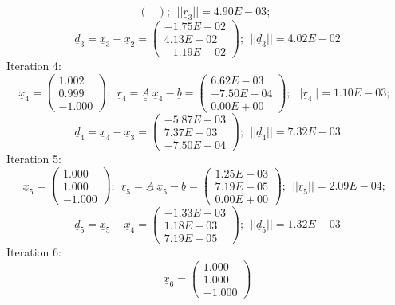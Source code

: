 \documentclass{report}[10pts]
\begin{document}
\begin{small}
\[\begin{pmatrix}
   \end{pmatrix}
;~~
||
\underline{r}_{3}
||=
4.90E-03
;~~
\]
\[
\underline{d}_{3}=
\underline{x}_{3}-
\underline{x}_{2}=
   \begin{pmatrix}
   -1.75E-02 \\ 4.13E-02 \\ -1.19E-02
   \end{pmatrix}
;~~
||
\underline{d}_{3}
||=
4.02E-02
\]
Iteration 4:
\[
\underline{x}_{4}=
   \begin{pmatrix}
   1.002 \\ 0.999 \\ -1.000
   \end{pmatrix}
;~~
\underline{r}_{4}=
\underline{\underline{A}}~\underline{x}_{4}-
\underline{b}=
   \begin{pmatrix}
   6.62E-03 \\ -7.50E-04 \\ 0.00E+00
   \end{pmatrix}
;~~
||
\underline{r}_{4}
||=
1.10E-03
;~~
\]
\[
\underline{d}_{4}=
\underline{x}_{4}-
\underline{x}_{3}=
   \begin{pmatrix}
   -5.87E-03 \\ 7.37E-03 \\ -7.50E-04
   \end{pmatrix}
;~~
||
\underline{d}_{4}
||=
7.32E-03
\]
Iteration 5:
\[
\underline{x}_{5}=
   \begin{pmatrix}
   1.000 \\ 1.000 \\ -1.000
   \end{pmatrix}
;~~
\underline{r}_{5}=
\underline{\underline{A}}~\underline{x}_{5}-
\underline{b}=
   \begin{pmatrix}
   1.25E-03 \\ 7.19E-05 \\ 0.00E+00
   \end{pmatrix}
;~~
||
\underline{r}_{5}
||=
2.09E-04
;~~
\]
\[
\underline{d}_{5}=
\underline{x}_{5}-
\underline{x}_{4}=
   \begin{pmatrix}
   -1.33E-03 \\ 1.18E-03 \\ 7.19E-05
   \end{pmatrix}
;~~
||
\underline{d}_{5}
||=
1.32E-03
\]
Iteration 6:
\[
\underline{x}_{6}=
   \begin{pmatrix}
   1.000 \\ 1.000 \\ -1.000
   \end{pmatrix}
\]
\end{small}
\end{document}
